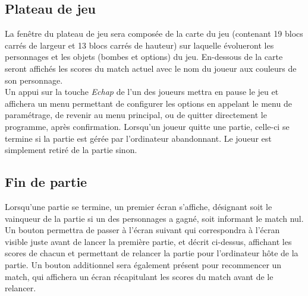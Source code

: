 \subsection{Plateau de jeu}

La fenêtre du plateau de jeu sera composée de la carte du jeu (contenant 19 blocs carrés de largeur et 13 blocs carrés de hauteur) sur laquelle évolueront les personnages et les objets (bombes et options) du jeu. En-dessous de la carte seront affichés les scores du match actuel avec le nom du joueur aux couleurs de son personnage.\\

Un appui sur la touche \emph{Echap} de l'un des joueurs mettra en pause le jeu et affichera un menu permettant de configurer les options en appelant le menu de paramétrage, de revenir au menu principal, ou de quitter directement le programme, après confirmation. Lorsqu'un joueur quitte une partie, celle-ci se termine si la partie est gérée par l'ordinateur abandonnant. Le joueur est simplement retiré de la partie sinon.\\

\subsection{Fin de partie}

Lorsqu'une partie se termine, un premier écran s'affiche, désignant soit le vainqueur de la partie si un des personnages a gagné, soit informant le match nul. Un bouton permettra de passer à l'écran suivant qui correspondra à l'écran visible juste avant de lancer la première partie, et décrit ci-dessus, affichant les scores de chacun et permettant de relancer la partie pour l'ordinateur hôte de la partie. Un bouton additionnel sera également présent pour recommencer un match, qui affichera un écran récapitulant les scores du match avant de le relancer.